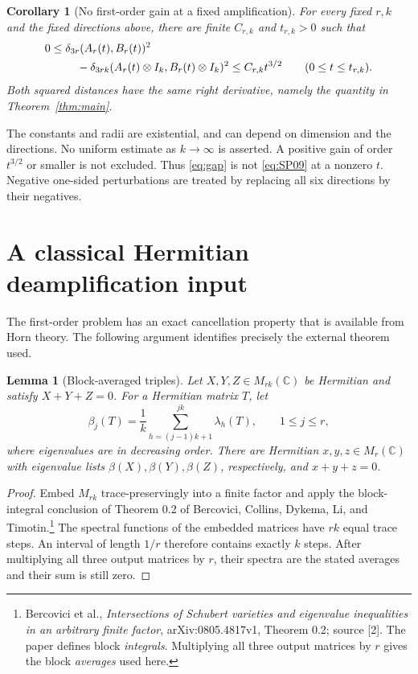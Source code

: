 \documentclass[11pt]{article}
\newtheorem{lemma}[theorem]{Lemma}
\newtheorem{corollary}[theorem]{Corollary}
\theoremstyle{remark}\newtheorem{remark}[theorem]{Remark}
\newcommand{\C}{\mathbb C}
\newcommand{\dd}{\delta}
\begin{document}
\begin{corollary}[No first-order gain at a fixed amplification]\label{cor:gap}
For every fixed $r,k$ and the fixed directions above, there are finite $C_{r,k}$ and $t_{r,k}>0$ such that
\begin{align}\label{eq:gap}
0\le {}&\dd_{3r}(A_r(t),B_r(t))^2\\[0em]
 &\quad-\dd_{3rk}(A_r(t)\otimes I_k,B_r(t)\otimes I_k)^2
 \le C_{r,k}t^{3/2}\qquad(0\le t\le t_{r,k}).\notag
\end{align}
Both squared distances have the same right derivative, namely the quantity in Theorem~\ref{thm:main}.
\end{corollary}

The constants and radii are existential, and can depend on dimension and the directions. No uniform estimate as $k\to\infty$ is asserted. A positive gain of order $t^{3/2}$ or smaller is not excluded. Thus \eqref{eq:gap} is not \eqref{eq:SP09} at a nonzero $t$. Negative one-sided perturbations are treated by replacing all six directions by their negatives.

\section{A classical Hermitian deamplification input}
The first-order problem has an exact cancellation property that is available from Horn theory. The following argument identifies precisely the external theorem used.

\begin{lemma}[Block-averaged triples]\label{lem:averages}
Let $X,Y,Z\in M_{rk}(\C)$ be Hermitian and satisfy $X+Y+Z=0$. For a Hermitian matrix $T$, let
\[
 \beta_j(T)=\frac1k\sum_{h=(j-1)k+1}^{jk}\lambda_h(T),\qquad 1\le j\le r,
\]
where eigenvalues are in decreasing order. There are Hermitian $x,y,z\in M_r(\C)$ with eigenvalue lists $\beta(X),\beta(Y),\beta(Z)$, respectively, and $x+y+z=0$.
\end{lemma}
\begin{proof}
Embed $M_{rk}$ trace-preservingly into a finite factor and apply the block-integral conclusion of Theorem 0.2 of Bercovici, Collins, Dykema, Li, and Timotin.\footnote{Bercovici et al., \emph{Intersections of Schubert varieties and eigenvalue inequalities in an arbitrary finite factor}, arXiv:0805.4817v1, Theorem 0.2; source [2]. The paper defines block \emph{integrals}. Multiplying all three output matrices by $r$ gives the block \emph{averages} used here.} The spectral functions of the embedded matrices have $rk$ equal trace steps. An interval of length $1/r$ therefore contains exactly $k$ steps. After multiplying all three output matrices by $r$, their spectra are the stated averages and their sum is still zero.
\end{proof}
\end{document}
